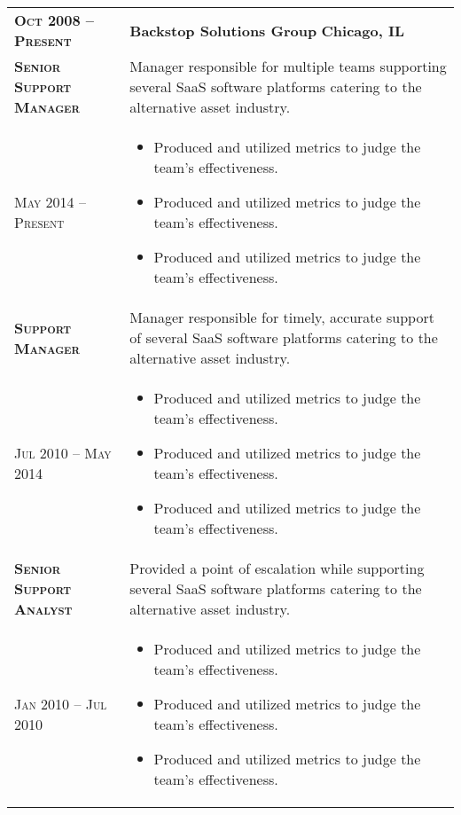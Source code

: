 \documentclass[a4paper, oneside, final]{scrartcl} %
\newcommand{\gray}{\rowcolor[gray]{.90}} %
\begin{document}
\begin{center}
\begin{tabularx}{0.97\linewidth}{>{\raggedright\scshape}p{3.4cm}X}
\gray \textbf{Oct 2008 -- Present} & \textbf{Backstop Solutions Group} \hfill \textbf{Chicago, IL}\\ 
\textbf{Senior Support Manager} & Manager responsible for multiple teams supporting several SaaS software platforms catering to the alternative asset industry.\\
May 2014 -- Present & \vspace{-6mm}
\begin{itemize}
\setlength{\itemsep}{0cm}%
\setlength{\parskip}{0cm}%
\item Produced and utilized metrics to judge the team's effectiveness.
\item Produced and utilized metrics to judge the team's effectiveness.
\item Produced and utilized metrics to judge the team's effectiveness.
\end{itemize}\\
\textbf{Support Manager} & Manager responsible for timely, accurate support of several SaaS software platforms catering to the alternative asset industry.\\
Jul 2010 -- May 2014 & \vspace{-6mm}
\begin{itemize}
\setlength{\itemsep}{0cm}%
\setlength{\parskip}{0cm}%
\item Produced and utilized metrics to judge the team's effectiveness.
\item Produced and utilized metrics to judge the team's effectiveness.
\item Produced and utilized metrics to judge the team's effectiveness.
\end{itemize}\\
\textbf{Senior Support Analyst} & Provided a point of escalation while supporting several SaaS software platforms catering to the alternative asset industry.\\
Jan 2010 -- Jul 2010 & \vspace{-6mm}
\begin{itemize}
\setlength{\itemsep}{0cm}%
\setlength{\parskip}{0cm}%
\item Produced and utilized metrics to judge the team's effectiveness.
\item Produced and utilized metrics to judge the team's effectiveness.
\item Produced and utilized metrics to judge the team's effectiveness.\end{itemize}\\

\end{tabularx}
\end{center}
\end{document}
